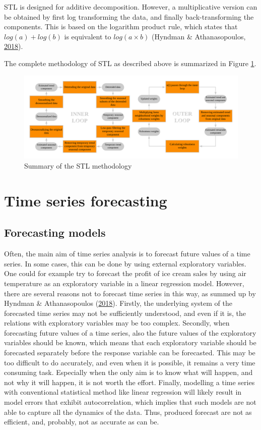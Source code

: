 \documentclass[12pt,oneside]{reedthesis}
\begin{document}
STL is designed for additive decomposition. However, a multiplicative
version can be obtained by first log transforming the data, and finally
back-transforming the components. This is based on the logarithm product
rule, which states that \(log(a) + log(b)\) is equivalent to
\(log(a \times b)\) (Hyndman \& Athanasopoulos,
\protect\hyperlink{ref-hyndman2018fpp}{2018}).

The complete methodology of STL as described above is summarized in
Figure \ref{fig:stl}.
\begin{figure}[h]
\includegraphics[width=\textwidth]{Figures/STL} \caption{Summary of the STL methodology}\label{fig:stl}
\end{figure}
\section{Time series forecasting}\label{twofour}

\subsection{Forecasting models}\label{twofourone}

Often, the main aim of time series analysis is to forecast future values
of a time series. In some cases, this can be done by using external
exploratory variables. One could for example try to forecast the profit
of ice cream sales by using air temperature as an exploratory variable
in a linear regression model. However, there are several reasons not to
forecast time series in this way, as summed up by Hyndman \&
Athanasopoulos (\protect\hyperlink{ref-hyndman2018fpp}{2018}). Firstly,
the underlying system of the forecasted time series may not be
sufficiently understood, and even if it is, the relations with
exploratory variables may be too complex. Secondly, when forecasting
future values of a time series, also the future values of the
exploratory variables should be known, which means that each exploratory
variable should be forecasted separately before the response variable
can be forecasted. This may be too difficult to do accurately, and even
when it is possible, it remains a very time consuming task. Especially
when the only aim is to know what will happen, and not why it will
happen, it is not worth the effort. Finally, modelling a time series
with conventional statistical method like linear regression will likely
result in model errors that exhibit autocorrelation, which implies that
such models are not able to capture all the dynamics of the data. Thus,
produced forecast are not as efficient, and, probably, not as accurate
as can be.
\end{document}
